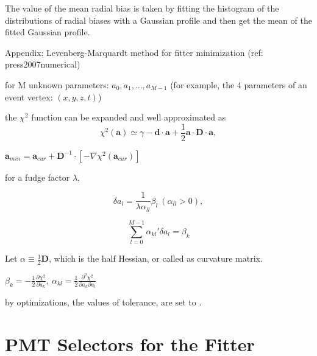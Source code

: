 The value of the mean radial bias is taken by fitting the histogram of the distributions of radial biases with a Gaussian profile and then get the mean of the fitted Gaussian profile.







Appendix: Levenberg-Marquardt method for fitter minimization
(ref: press2007numerical)

for M unknown parameters: $a_0, a_1, ... , a_{M-1}$ (for example, the 4 parameters of an event vertex: $(x,y,z,t)$)

the $\chi^2$ function can be expanded and well approximated as
\[
\chi^2(\textbf{a})\simeq \gamma - \textbf{d}\cdot\textbf{a}+\frac{1}{2}\textbf{a}\cdot \textbf{D}\cdot \textbf{a},
\]



$\textbf{a}_{min} = \textbf{a}_{cur}+\textbf{D}^{-1}\cdot[-\nabla \chi^2(\textbf{a}_{cur})]$

for a fudge factor $\lambda$, 

\[
\delta a_l = \frac{1}{\lambda \alpha_{ll}}\beta_l~(\alpha_{ll}>0),
\]

\[
\sum_{l=0}^{M-1} \alpha_{kl}'\delta a_l = \beta_k
\]

Let $\alpha\equiv\frac{1}{2}\textbf{D}$, which is the half Hessian, or called as curvature matrix.

$\beta_k = -\frac{1}{2}\frac{\partial\chi^2}{\partial a_k},~\alpha_{kl}=\frac{1}{2}\frac{\partial^2 \chi^2}{\partial a_k\partial a_l}$

by optimizations, the values of tolerance, are set to .



\section{PMT Selectors for the Fitter}


